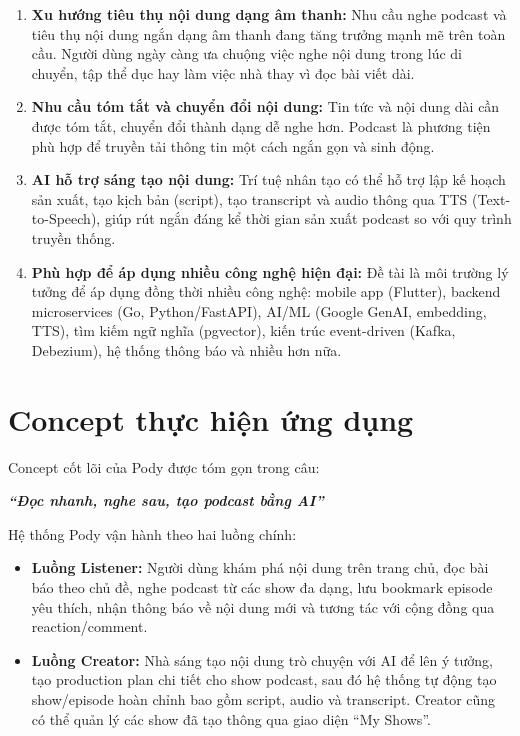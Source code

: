\documentclass[14pt,a4paper,oneside]{extreport}
\begin{document}
\begin{enumerate}[leftmargin=2cm]
  \item \textbf{Xu hướng tiêu thụ nội dung dạng âm thanh:} Nhu cầu nghe podcast và tiêu thụ nội dung ngắn dạng âm thanh đang tăng trưởng mạnh mẽ trên toàn cầu. Người dùng ngày càng ưa chuộng việc nghe nội dung trong lúc di chuyển, tập thể dục hay làm việc nhà thay vì đọc bài viết dài.

  \item \textbf{Nhu cầu tóm tắt và chuyển đổi nội dung:} Tin tức và nội dung dài cần được tóm tắt, chuyển đổi thành dạng dễ nghe hơn. Podcast là phương tiện phù hợp để truyền tải thông tin một cách ngắn gọn và sinh động.

  \item \textbf{AI hỗ trợ sáng tạo nội dung:} Trí tuệ nhân tạo có thể hỗ trợ lập kế hoạch sản xuất, tạo kịch bản (script), tạo transcript và audio thông qua TTS (Text-to-Speech), giúp rút ngắn đáng kể thời gian sản xuất podcast so với quy trình truyền thống.

  \item \textbf{Phù hợp để áp dụng nhiều công nghệ hiện đại:} Đề tài là môi trường lý tưởng để áp dụng đồng thời nhiều công nghệ: mobile app (Flutter), backend microservices (Go, Python/FastAPI), AI/ML (Google GenAI, embedding, TTS), tìm kiếm ngữ nghĩa (pgvector), kiến trúc event-driven (Kafka, Debezium), hệ thống thông báo và nhiều hơn nữa.
\end{enumerate}

\section{Concept thực hiện ứng dụng}
\label{sec:concept}

Concept cốt lõi của Pody được tóm gọn trong câu:

\begin{center}
  \textit{\textbf{``Đọc nhanh, nghe sau, tạo podcast bằng AI''}}
\end{center}

Hệ thống Pody vận hành theo hai luồng chính:

\begin{itemize}[leftmargin=2cm]
  \item \textbf{Luồng Listener:} Người dùng khám phá nội dung trên trang chủ, đọc bài báo theo chủ đề, nghe podcast từ các show đa dạng, lưu bookmark episode yêu thích, nhận thông báo về nội dung mới và tương tác với cộng đồng qua reaction/comment.

  \item \textbf{Luồng Creator:} Nhà sáng tạo nội dung trò chuyện với AI để lên ý tưởng, tạo production plan chi tiết cho show podcast, sau đó hệ thống tự động tạo show/episode hoàn chỉnh bao gồm script, audio và transcript. Creator cũng có thể quản lý các show đã tạo thông qua giao diện ``My Shows''.
\end{itemize}
\end{document}
